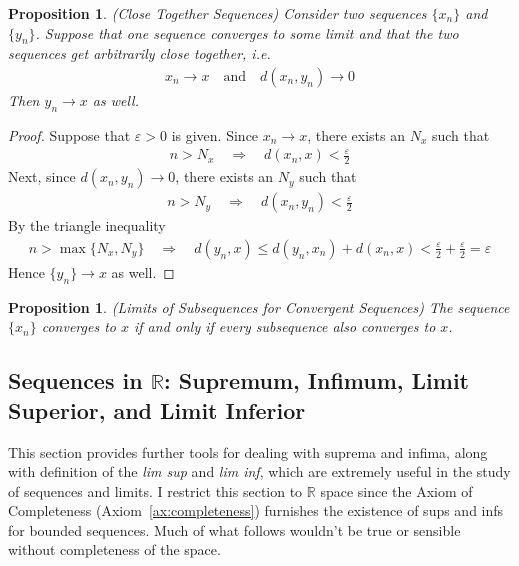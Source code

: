 \documentclass[12pt]{article}
\theoremstyle{plain}
\newtheorem{prop}[thm]{Proposition}
\theoremstyle{definition}
\theoremstyle{remark}
\newcommand{\R}{\mathbb{R}}
\begin{document}
\begin{prop}{\emph{(Close Together Sequences)}}
Consider two sequences $\{x_n\}$ and $\{y_n\}$.
Suppose that one sequence converges to some limit and that the two
sequences get arbitrarily close together, i.e.
\begin{align*}
  x_n\rightarrow x
  \quad\text{and}\quad
  d(x_n,y_n)\rightarrow 0
\end{align*}
Then $y_n\rightarrow x$ as well.
\end{prop}
\begin{proof}
Suppose that $\varepsilon>0$ is given. Since $x_n\rightarrow x$, there
exists an $N_x$ such that
\begin{align*}
  n > N_x
  \quad\Rightarrow\quad
  d(x_n,x) < \frac{\varepsilon}{2}
\end{align*}
Next, since $d(x_n,y_n)\rightarrow 0$, there exists an $N_y$ such that
\begin{align*}
  n > N_y
  \quad\Rightarrow\quad
  d(x_n,y_n) < \frac{\varepsilon}{2}
\end{align*}
By the triangle inequality
\begin{align*}
  n>\max\{N_x,N_y\}
  \quad\Rightarrow\quad
  d(y_n,x) \leq
  d(y_n,x_n) + d(x_n,x)
  < \frac{\varepsilon}{2} + \frac{\varepsilon}{2} = \varepsilon
\end{align*}
Hence $\{y_n\}\rightarrow x$ as well.

\end{proof}

\begin{prop}{\emph{(Limits of Subsequences for Convergent Sequences)}}
\label{prop:subseq}
The sequence $\{x_n\}$ converges to $x$ if and only if every subsequence
also converges to $x$.
\end{prop}


\subsection{Sequences in $\R$: Supremum, Infimum, Limit Superior, and
Limit Inferior}

This section provides further tools for dealing with suprema and infima,
along with definition of the \emph{lim sup} and \emph{lim inf}, which
are extremely useful in the study of sequences and limits.
I restrict this section to $\R$ space since the Axiom of Completeness
(Axiom~\ref{ax:completeness}) furnishes the existence of sups and infs
for bounded sequences. Much of what follows wouldn't be true or sensible
without completeness of the space.
\end{document}
